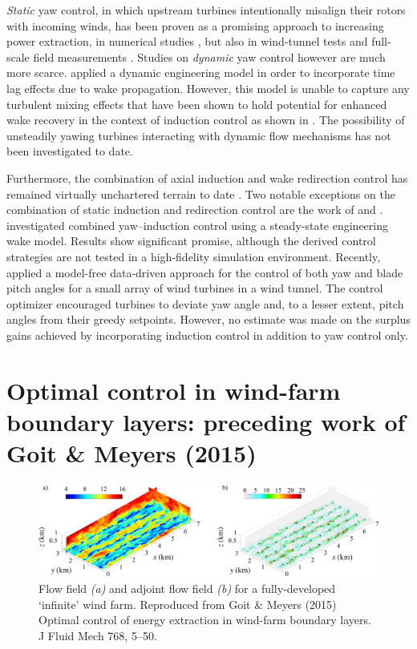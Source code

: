 \emph{Static} yaw control, in which upstream turbines intentionally misalign their rotors with incoming winds, has been proven as a promising approach to increasing power extraction, in numerical studies \citep{gebraad2016wind, quick2017optimization}, but also in wind-tunnel tests \citep{campagnolo2016wind2,park2017data} and full-scale field measurements \citep{soleimanzadeh2014state, fleming2017field}. Studies on \emph{dynamic} yaw control however are much more scarce. \cite{gebraad2015wind} applied a dynamic engineering model in order to incorporate time lag effects due to wake propagation. However, this model is unable to capture any turbulent mixing effects that have been shown to hold potential for enhanced wake recovery in the context of induction control as shown in \cite{goit2015optimal}. The possibility of unsteadily yawing turbines interacting with dynamic flow mechanisms has not been investigated to date. 

Furthermore, the combination of axial induction and wake redirection control has remained virtually unchartered terrain to date \citep{boersma2017tutorial}. Two notable exceptions on the combination of static induction and redirection control are the work of \cite{park2015cooperative} and \cite{park2017data}. \cite{park2015cooperative} investigated combined yaw--induction control using a steady-state engineering wake model. Results show significant promise, although the derived control strategies are not tested in a high-fidelity simulation environment. Recently, \cite{park2017data} applied a model-free data-driven approach for the control of both yaw and blade pitch angles for a small array of wind turbines in a wind tunnel. The control optimizer encouraged turbines to deviate yaw angle and, to a lesser extent, pitch angles from their greedy setpoints. However, no estimate was made on the surplus gains achieved by incorporating induction control in addition to yaw control only. 

\section{Optimal control in wind-farm boundary layers: preceding work of Goit \& Meyers (2015)}\label{sec:goitmeyersjfm}

\begin{figure}
	\includegraphics[width=\textwidth]{chapters/introduction/forward_adjoint4.eps}
	\caption{Flow field \emph{(a)} and adjoint flow field \emph{(b)} for a fully-developed `infinite' wind farm. Reproduced from Goit \& Meyers (2015) Optimal control of energy extraction in wind-farm boundary layers. J Fluid Mech 768, 5--50. \label{fig:flowfield_intro}}
\end{figure}

